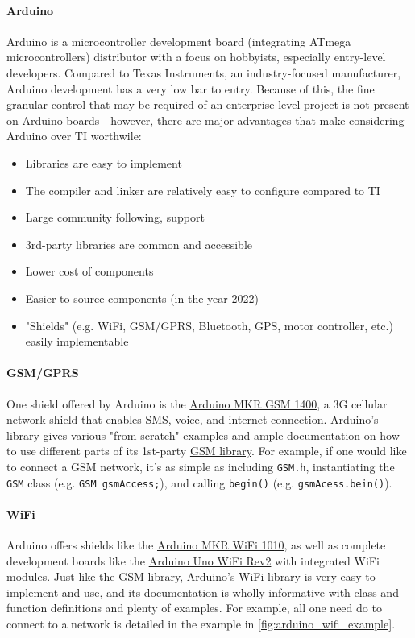 \paragraph{Arduino} Arduino is a microcontroller development board (integrating ATmega microcontrollers) distributor with a focus on hobbyists, especially entry-level developers. Compared to Texas Instruments, an industry-focused manufacturer, Arduino development has a very low bar to entry. Because of this, the fine granular control that may be required of an enterprise-level project is not present on Arduino boards---however, there are major advantages that make considering Arduino over TI worthwile:
\begin{itemize}
    \item Libraries are easy to implement
    \item The compiler and linker are relatively easy to configure compared to TI
    \item Large community following, support
    \item 3rd-party libraries are common and accessible
    \item Lower cost of components
    \item Easier to source components (in the year 2022)
    \item "Shields" (e.g. WiFi, GSM/GPRS, Bluetooth, GPS, motor controller, etc.) easily implementable
\end{itemize}
\paragraph{GSM/GPRS} One shield offered by Arduino is the \href{https://store.arduino.cc/products/arduino-mkr-gsm-1400}{Arduino MKR GSM 1400}, a 3G cellular network shield that enables SMS, voice, and internet connection. Arduino's library gives various "from scratch" examples and ample documentation on how to use different parts of its 1st-party \href{https://docs.arduino.cc/retired/archived-libraries/GSM}{GSM library}. For example, if one would like to connect a GSM network, it's as simple as including \texttt{GSM.h}, instantiating the \texttt{GSM} class (e.g. \texttt{GSM gsmAccess;}), and calling \texttt{begin()} (e.g. \texttt{gsmAcess.bein()}).

\paragraph{WiFi} Arduino offers shields like the \href{https://store.arduino.cc/products/arduino-mkr-wifi-1010}{Arduino MKR WiFi 1010}, as well as complete development boards like the \href{https://store.arduino.cc/products/arduino-uno-wifi-rev2}{Arduino Uno WiFi Rev2} with integrated WiFi modules. Just like the GSM library, Arduino's \href{https://www.arduino.cc/reference/en/libraries/wifi/}{WiFi library} is very easy to implement and use, and its documentation is wholly informative with class and function definitions and plenty of examples. For example, all one need do to connect to a network is detailed in the example in \autoref{fig:arduino_wifi_example}.

